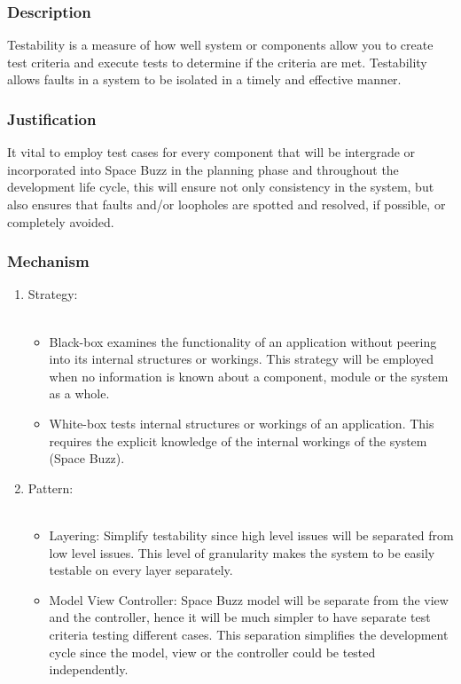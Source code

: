 
	\subsubsection*{Description}
		Testability is a measure of how well system or components allow you to create test criteria and execute tests to determine if the criteria are met. Testability allows faults in a system to be isolated in a timely and effective manner.
		
		
	\subsubsection*{Justification}
	It vital to employ test cases for every component that will be intergrade or incorporated into Space Buzz in the planning phase and throughout the development life cycle, this will ensure not only consistency in the system, but also ensures that faults and/or loopholes are spotted and resolved, if possible, or completely avoided. 
	
	\subsubsection*{Mechanism}
		\begin{enumerate}
			\item Strategy:\\\\
		\begin{itemize}
			\item	Black-box examines the functionality of an application without peering into its internal structures or workings. This strategy will be employed when no information is known about a component, module or the system as a whole.
			\item	White-box tests internal structures or workings of an application. This requires the explicit knowledge of the internal workings of the system (Space Buzz).
		\end{itemize}
		
		
			 \item Pattern:\\\\
		 \begin{itemize}
			\item	Layering:  Simplify testability since high level issues will be separated from low level issues. This level of granularity makes the system to be easily testable on every layer separately.
			\item Model View Controller: Space Buzz model will be separate from the view and the controller, hence it will be much simpler to have separate test criteria testing different cases. This separation simplifies the development cycle since the model, view or the controller could be tested independently. 
		\end{itemize}
\end{enumerate}